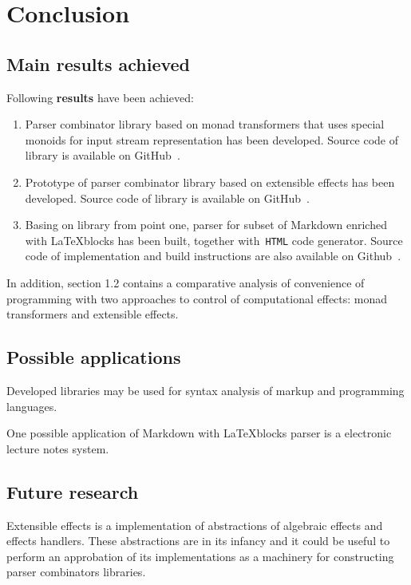 \chapter{Conclusion}

\section{Main results achieved} 
  
  Following \textbf{results} have been achieved:

  \begin{enumerate}

    \item Parser combinator library based on monad transformers that uses special 
    monoids for input stream representation has been developed. Source code of
    library is available on GitHub~\cite{mdParse}.

    \item Prototype of parser combinator library based on extensible effects has
    been developed. Source code of library is available on GitHub~\cite{mdParse}.

    \item Basing on library from point one, parser for subset of Markdown enriched 
    with \LaTeX blocks has been built, together with~\lstinline{HTML} code generator. Source code of implementation and build instructions are also available on 
    Github~\cite{mdParse}.   

  \end{enumerate}

  In addition, section 1.2 contains a comparative analysis of convenience of 
  programming with two approaches to control of computational effects: monad
  transformers and extensible effects.

\section{Possible applications}

  Developed libraries may be used for syntax analysis of markup and programming 
  languages.

  One possible application of Markdown with \LaTeX blocks parser is a electronic 
  lecture notes system. 

\section{Future research}
  
  Extensible effects is a implementation of abstractions of algebraic effects and 
  effects handlers. These abstractions are in its infancy and it could be useful 
  to perform an approbation of its implementations as a machinery for constructing  
  parser combinators libraries.